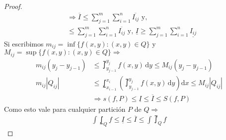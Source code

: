 \begin{theorem}
\begin{proof}
\begin{align*}
                                                                         & \Rightarrow  \overline{I} \leq \sum_{j = 1}^m \sum_{i = 1}^n \overline{I_{ij}} \text{ y,}                                                                                                                             \\
                                                                         & \leq \sum_{j = 1}^m \sum_{i = 1}^n \overline{I_{ij}} \text{ y, } \underline{I} \geq \sum_{j = 1}^m \sum_{i = 1}^n \underline{I_{ij}}
    \end{align*}
    Si escribimos \(m_{ij} = \inf \{ f(x, y) : (x, y) \in Q \} \) y \(M_{ij} = \sup \{ f(x, y) : (x, y) \in Q\} \Rightarrow \) \begin{align*}
      m_{ij} (y_j - y_{j-1}) & \leq \upint_{y_{j-1}}^{y_j} f(x, y)\, \mathrm{d} y \leq M_{ij} (y_j - y_{j-1})                                \\
      m_{ij} |Q_{ij}|        & \leq \lowint_{x_{i-1}}^{x_i} ( \upint_{y_{j-1}}^{y_j} f(x, y)\, \mathrm{d}y )\mathrm{d}x \leq M_{ij} |Q_{ij}| \\
                             & \Rightarrow s(f, P) \leq \underline{I} \leq \overline{I} \leq S(f, P)
    \end{align*}
    Como esto vale para cualquier partición \(P\) de \(Q \Rightarrow \) \begin{align*}
      \int\lowint_Q f \leq \underline{I} \leq \overline{I} \leq \int\upint_Q f
    \end{align*}
  \end{proof}
\end{theorem}

\clearpage

